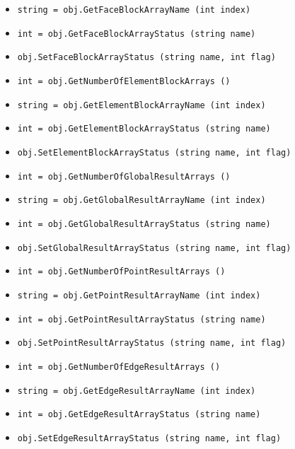 \begin{itemize}
\item  \verb|string = obj.GetFaceBlockArrayName (int index)|

\item  \verb|int = obj.GetFaceBlockArrayStatus (string name)|

\item  \verb|obj.SetFaceBlockArrayStatus (string name, int flag)|

\item  \verb|int = obj.GetNumberOfElementBlockArrays ()|

\item  \verb|string = obj.GetElementBlockArrayName (int index)|

\item  \verb|int = obj.GetElementBlockArrayStatus (string name)|

\item  \verb|obj.SetElementBlockArrayStatus (string name, int flag)|

\item  \verb|int = obj.GetNumberOfGlobalResultArrays ()|

\item  \verb|string = obj.GetGlobalResultArrayName (int index)|

\item  \verb|int = obj.GetGlobalResultArrayStatus (string name)|

\item  \verb|obj.SetGlobalResultArrayStatus (string name, int flag)|

\item  \verb|int = obj.GetNumberOfPointResultArrays ()|

\item  \verb|string = obj.GetPointResultArrayName (int index)|

\item  \verb|int = obj.GetPointResultArrayStatus (string name)|

\item  \verb|obj.SetPointResultArrayStatus (string name, int flag)|

\item  \verb|int = obj.GetNumberOfEdgeResultArrays ()|

\item  \verb|string = obj.GetEdgeResultArrayName (int index)|

\item  \verb|int = obj.GetEdgeResultArrayStatus (string name)|

\item  \verb|obj.SetEdgeResultArrayStatus (string name, int flag)|


\end{itemize}
